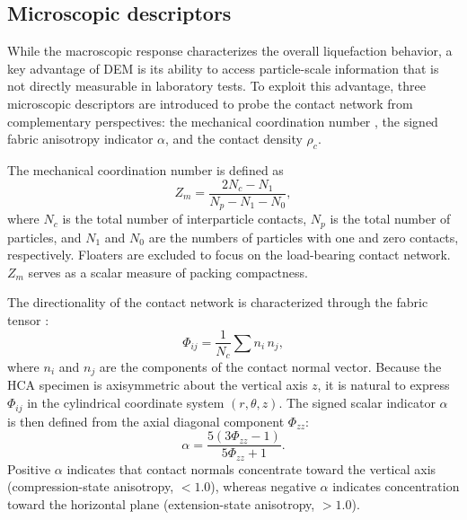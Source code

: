 \subsection{Microscopic descriptors}
\label{subsec:micro_descriptors}

While the macroscopic response characterizes the overall liquefaction behavior, a key advantage of DEM is its ability to access particle-scale information that is not directly measurable in laboratory tests. To exploit this advantage, three microscopic descriptors are introduced to probe the contact network from complementary perspectives: the mechanical coordination number \Zm{}, the signed fabric anisotropy indicator $\alpha$, and the contact density $\rho_c$.

The mechanical coordination number \citep{Thornton2000,Oda1977} is defined as
\begin{equation}
Z_m = \frac{2N_c - N_1}{N_p - N_1 - N_0},
\label{eq:zm_definition_method}
\end{equation}
where $N_c$ is the total number of interparticle contacts, $N_p$ is the total number of particles, and $N_1$ and $N_0$ are the numbers of particles with one and zero contacts, respectively. Floaters are excluded to focus on the load-bearing contact network. $Z_m$ serves as a scalar measure of packing compactness.

The directionality of the contact network is characterized through the fabric tensor \citep{Oda1982fabric,Oda1982stat}:
\begin{equation}
\Phi_{ij} = \frac{1}{N_c}\sum n_i\,n_j,
\label{eq:fabric_tensor}
\end{equation}
where $n_i$ and $n_j$ are the components of the contact normal vector. Because the HCA specimen is axisymmetric about the vertical axis $z$, it is natural to express $\Phi_{ij}$ in the cylindrical coordinate system $(r,\theta,z)$. The signed scalar indicator $\alpha$ \citep{YimsiriSoga2010,Otsubo2022} is then defined from the axial diagonal component $\Phi_{zz}$:
\begin{equation}
\alpha = \frac{5(3\Phi_{zz} - 1)}{5\Phi_{zz} + 1}.
\label{eq:alpha_definition_method}
\end{equation}
Positive $\alpha$ indicates that contact normals concentrate toward the vertical axis (compression-state anisotropy, \Kzero{} $< 1.0$), whereas negative $\alpha$ indicates concentration toward the horizontal plane (extension-state anisotropy, \Kzero{} $> 1.0$).

